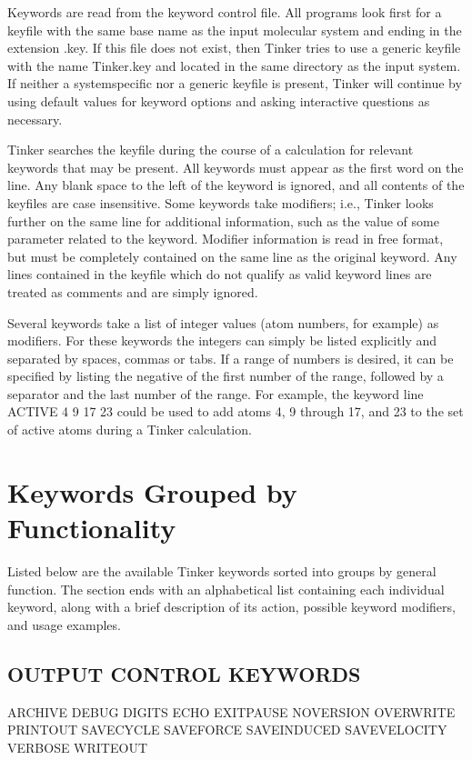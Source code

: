 \documentclass[letterpaper,11pt,english]{sphinxmanual}
\begin{document}
Keywords are read from the keyword control file. All programs look first for a keyfile with the same base name as the input molecular system and ending in the extension .key. If this file does not exist, then Tinker tries to use a generic keyfile with the name Tinker.key and located in the same directory as the input system. If neither a system\sphinxhyphen{}specific nor a generic keyfile is present, Tinker will continue by using default values for keyword options and asking interactive questions as necessary.

Tinker searches the keyfile during the course of a calculation for relevant keywords that may be present. All keywords must appear as the first word on the line. Any blank space to the left of the keyword is ignored, and all contents of the keyfiles are case insensitive. Some keywords take modifiers; i.e., Tinker looks further on the same line for additional information, such as the value of some parameter related to the keyword. Modifier information is read in free format, but must be completely contained on the same line as the original keyword. Any lines contained in the keyfile which do not qualify as valid keyword lines are treated as comments and are simply ignored.

Several keywords take a list of integer values (atom numbers, for example) as modifiers. For these keywords the integers can simply be listed explicitly and separated by spaces, commas or tabs. If a range of numbers is desired, it can be specified by listing the negative of the first number of the range, followed by a separator and the last number of the range. For example, the keyword line ACTIVE 4 \sphinxhyphen{}9 17 23 could be used to add atoms 4, 9 through 17, and 23 to the set of active atoms during a Tinker calculation.


\section{Keywords Grouped by Functionality}
\label{\detokenize{text/keywords:keywords-grouped-by-functionality}}
Listed below are the available Tinker keywords sorted into groups by general function. The section ends with an alphabetical list containing each individual keyword, along with a brief description of its action, possible keyword modifiers, and usage examples.


\subsection{OUTPUT CONTROL KEYWORDS}
\label{\detokenize{text/keywords:output-control-keywords}}
ARCHIVE DEBUG   DIGITS
ECHO    EXIT\sphinxhyphen{}PAUSE      NOVERSION
OVERWRITE       PRINTOUT        SAVE\sphinxhyphen{}CYCLE
SAVE\sphinxhyphen{}FORCE      SAVE\sphinxhyphen{}INDUCED    SAVE\sphinxhyphen{}VELOCITY
VERBOSE WRITEOUT
\end{document}
